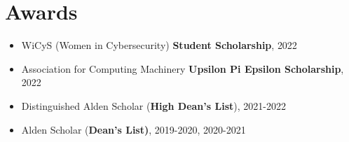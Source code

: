 \documentclass[letterpaper,11pt]{article}
\newcommand{\resumeItem}[1]{
  \item\small{
    {#1 \vspace{-1pt}}
  }
}
\newcommand{\resumeItemListStart}{\begin{itemize}}
\newcommand{\resumeItemListEnd}{\end{itemize}\vspace{0pt}}
\begin{document}
  \section{Awards}
          
    \resumeItemListStart
        \resumeItem{}{WiCyS (Women in Cybersecurity) \textbf{Student Scholarship}}, {2022}
          \resumeItem{}{Association for Computing Machinery \textbf{Upsilon Pi Epsilon Scholarship}}, {2022}
          \resumeItem{}{Distinguished Alden Scholar (\textbf{High Dean's List})}, {2021-2022}
          \resumeItem{}{Alden Scholar (\textbf{Dean's List)}}, {2019-2020, 2020-2021}
     \resumeItemListEnd
\end{document}
